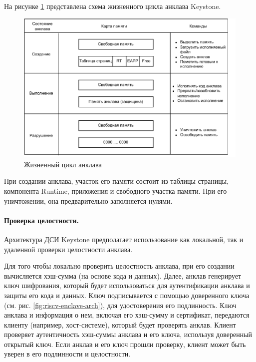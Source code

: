 На рисунке \ref{fig:riscv-enclave-lifecycle} представлена схема жизненного цикла анклава Keystone.

\begin{figure}[h]
	\centering
	\includegraphics[width=\textwidth]{img/riscv-enclave-lifecycle.pdf}
	\caption{Жизненный цикл анклава}
	\label{fig:riscv-enclave-lifecycle}
\end{figure}

При создании анклава, участок его памяти состоит из таблицы страницы, компонента Runtime, приложения и свободного участка памяти. При его уничтожении, она предварительно заполняется нулями.

\paragraph{Проверка целостности.}

Архитектура ДСИ Keystone предполагает использование как локальной, так и удаленной проверки целостности анклава.

Для того чтобы локально проверить целостность анклава, при его создании вычисляется хэш-сумма (на основе кода и данных). Далее, анклав генерирует ключ шифрования, который будет использоваться для аутентификации анклава и защиты его кода и данных. Ключ подписывается с помощью доверенного ключа (см. рис. \ref{fig:riscv-enclave-arch}), для удостоверения его подлинность. Ключ анклава и информация о нем, включая его хэш-сумму и сертификат, передаются клиенту (например, хост-системе), который будет проверять анклав. Клиент проверяет аутентичность хэш-суммы анклава и его ключа, используя доверенный открытый ключ. Если анклав и его ключ прошли проверку, клиент может быть уверен в его подлинности и целостности.

